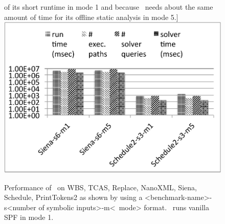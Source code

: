 \begin{figure}
    of its short runtime in mode 1 and because \tool\ needs about the same amount of time for its offline static analysis
    in mode 5.]{
    {\includegraphics[width=\columnwidth]{figures/siena-schedule2-results.pdf} }
    \label{fig:siena-schedule2-results}}%
    \hfill
    \caption{Performance of \tool\ on WBS, TCAS, Replace, NanoXML, Siena, Schedule, PrintTokens2 as shown by using a
    <benchmark-name>-s<number of symbolic inputs>-m<\tool\ mode> format. \tool\ runs vanilla SPF in mode 1.}%
    \label{fig:results1}%
\end{figure}
